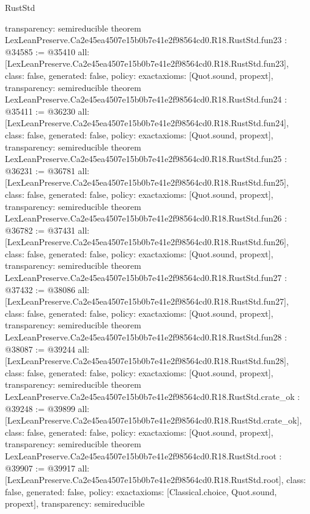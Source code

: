 \begin{lexlean}{RustStd}
\begin{coremodule}
{  transparency: semireducible
}
theorem LexLeanPreserve.Ca2e45ea4507e15b0b7e41e2f98564cd0.R18.RustStd.fun23 : @34585 := @35410 {
  all: [LexLeanPreserve.Ca2e45ea4507e15b0b7e41e2f98564cd0.R18.RustStd.fun23],
  class: false,
  generated: false,
  policy: exact{axioms: [Quot.sound, propext]},
  transparency: semireducible
}
theorem LexLeanPreserve.Ca2e45ea4507e15b0b7e41e2f98564cd0.R18.RustStd.fun24 : @35411 := @36230 {
  all: [LexLeanPreserve.Ca2e45ea4507e15b0b7e41e2f98564cd0.R18.RustStd.fun24],
  class: false,
  generated: false,
  policy: exact{axioms: [Quot.sound, propext]},
  transparency: semireducible
}
theorem LexLeanPreserve.Ca2e45ea4507e15b0b7e41e2f98564cd0.R18.RustStd.fun25 : @36231 := @36781 {
  all: [LexLeanPreserve.Ca2e45ea4507e15b0b7e41e2f98564cd0.R18.RustStd.fun25],
  class: false,
  generated: false,
  policy: exact{axioms: [Quot.sound, propext]},
  transparency: semireducible
}
theorem LexLeanPreserve.Ca2e45ea4507e15b0b7e41e2f98564cd0.R18.RustStd.fun26 : @36782 := @37431 {
  all: [LexLeanPreserve.Ca2e45ea4507e15b0b7e41e2f98564cd0.R18.RustStd.fun26],
  class: false,
  generated: false,
  policy: exact{axioms: [Quot.sound, propext]},
  transparency: semireducible
}
theorem LexLeanPreserve.Ca2e45ea4507e15b0b7e41e2f98564cd0.R18.RustStd.fun27 : @37432 := @38086 {
  all: [LexLeanPreserve.Ca2e45ea4507e15b0b7e41e2f98564cd0.R18.RustStd.fun27],
  class: false,
  generated: false,
  policy: exact{axioms: [Quot.sound, propext]},
  transparency: semireducible
}
theorem LexLeanPreserve.Ca2e45ea4507e15b0b7e41e2f98564cd0.R18.RustStd.fun28 : @38087 := @39244 {
  all: [LexLeanPreserve.Ca2e45ea4507e15b0b7e41e2f98564cd0.R18.RustStd.fun28],
  class: false,
  generated: false,
  policy: exact{axioms: [Quot.sound, propext]},
  transparency: semireducible
}
theorem LexLeanPreserve.Ca2e45ea4507e15b0b7e41e2f98564cd0.R18.RustStd.crate_ok : @39248 := @39899 {
  all: [LexLeanPreserve.Ca2e45ea4507e15b0b7e41e2f98564cd0.R18.RustStd.crate_ok],
  class: false,
  generated: false,
  policy: exact{axioms: [Quot.sound, propext]},
  transparency: semireducible
}
theorem LexLeanPreserve.Ca2e45ea4507e15b0b7e41e2f98564cd0.R18.RustStd.root : @39907 := @39917 {
  all: [LexLeanPreserve.Ca2e45ea4507e15b0b7e41e2f98564cd0.R18.RustStd.root],
  class: false,
  generated: false,
  policy: exact{axioms: [Classical.choice, Quot.sound, propext]},
  transparency: semireducible
}


\end{coremodule}
\end{lexlean}
